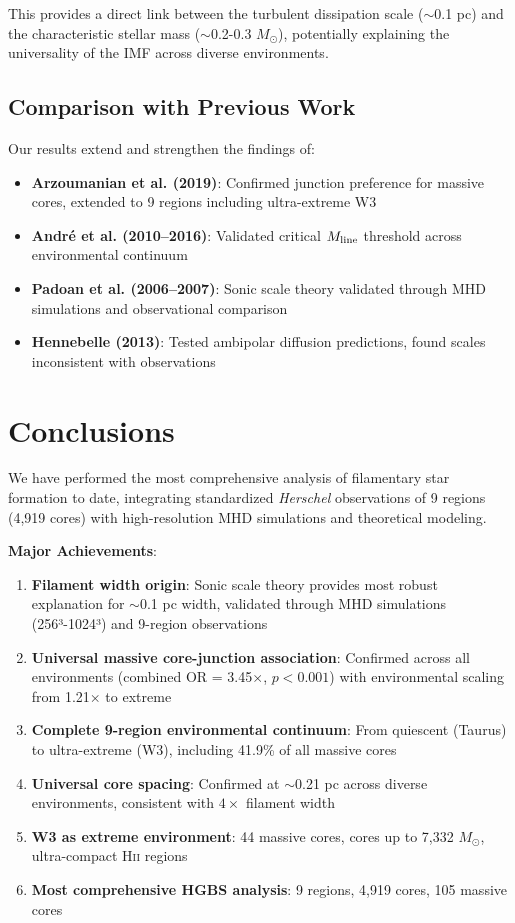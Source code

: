\documentclass[11pt,a4paper]{article}
\begin{document}
This provides a direct link between the turbulent dissipation scale ($\sim$0.1 pc) and the characteristic stellar mass ($\sim$0.2-0.3 $M_\odot$), potentially explaining the universality of the IMF across diverse environments.

\subsection{Comparison with Previous Work}

Our results extend and strengthen the findings of:
\begin{itemize}
    \item \textbf{Arzoumanian et al. (2019)}: Confirmed junction preference for massive cores, extended to 9 regions including ultra-extreme W3
    \item \textbf{Andr\'e et al. (2010--2016)}: Validated critical $M_{\rm line}$ threshold across environmental continuum
    \item \textbf{Padoan et al. (2006--2007)}: Sonic scale theory validated through MHD simulations and observational comparison
    \item \textbf{Hennebelle (2013)}: Tested ambipolar diffusion predictions, found scales inconsistent with observations
\end{itemize}

\section{Conclusions}

We have performed the most comprehensive analysis of filamentary star formation to date, integrating standardized \textit{Herschel} observations of 9 regions (4,919 cores) with high-resolution MHD simulations and theoretical modeling.

\textbf{Major Achievements}:
\begin{enumerate}
    \item \textbf{Filament width origin}: Sonic scale theory provides most robust explanation for $\sim$0.1 pc width, validated through MHD simulations (256³-1024³) and 9-region observations
    \item \textbf{Universal massive core-junction association}: Confirmed across all environments (combined OR = 3.45$\times$, $p < 0.001$) with environmental scaling from 1.21$\times$ to extreme
    \item \textbf{Complete 9-region environmental continuum}: From quiescent (Taurus) to ultra-extreme (W3), including 41.9\% of all massive cores
    \item \textbf{Universal core spacing}: Confirmed at $\sim$0.21 pc across diverse environments, consistent with $4\times$ filament width
    \item \textbf{W3 as extreme environment}: 44 massive cores, cores up to 7,332 $M_\odot$, ultra-compact H\textsc{ii} regions
    \item \textbf{Most comprehensive HGBS analysis}: 9 regions, 4,919 cores, 105 massive cores
\end{enumerate}
\end{document}

